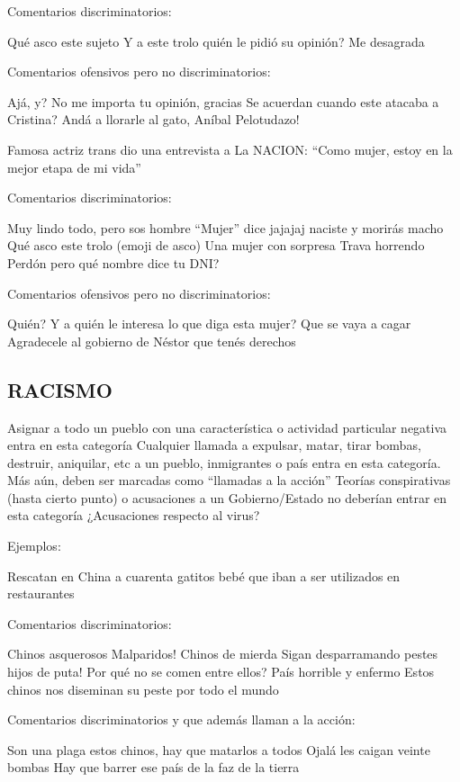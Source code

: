 Comentarios discriminatorios:

Qué asco este sujeto
Y a este trolo quién le pidió su opinión?
Me desagrada


Comentarios ofensivos pero no discriminatorios:

Ajá, y?
No me importa tu opinión, gracias
Se acuerdan cuando este atacaba a Cristina? Andá a llorarle al gato, Aníbal
Pelotudazo!


Famosa actriz trans dio una entrevista a La NACION: “Como mujer, estoy en la mejor etapa de mi vida”


Comentarios discriminatorios:

Muy lindo todo, pero sos hombre
“Mujer” dice jajajaj naciste y morirás macho
Qué asco este trolo
(emoji de asco)
Una mujer con sorpresa
Trava horrendo
Perdón pero qué nombre dice tu DNI?


Comentarios ofensivos pero no discriminatorios:

Quién?
Y a quién le interesa lo que diga esta mujer?
Que se vaya a cagar
Agradecele al gobierno de Néstor que tenés derechos





\subsection{RACISMO}

Asignar a todo un pueblo con una característica o actividad particular negativa entra en esta categoría
Cualquier llamada a expulsar, matar, tirar bombas, destruir, aniquilar, etc a un pueblo, inmigrantes o país entra en esta categoría. Más aún, deben ser marcadas como “llamadas a la acción”
Teorías conspirativas (hasta cierto punto) o acusaciones a un Gobierno/Estado no deberían entrar en esta categoría
¿Acusaciones respecto al virus?



Ejemplos:

Rescatan en China a cuarenta gatitos bebé que iban a ser utilizados en restaurantes


Comentarios discriminatorios:

Chinos asquerosos
Malparidos! Chinos de mierda
Sigan desparramando pestes hijos de puta!
Por qué no se comen entre ellos?
País horrible y enfermo
Estos chinos nos diseminan su peste por todo el mundo

Comentarios discriminatorios y que además llaman a la acción:

Son una plaga estos chinos, hay que matarlos a todos
Ojalá les caigan veinte bombas
Hay que barrer ese país de la faz de la tierra

